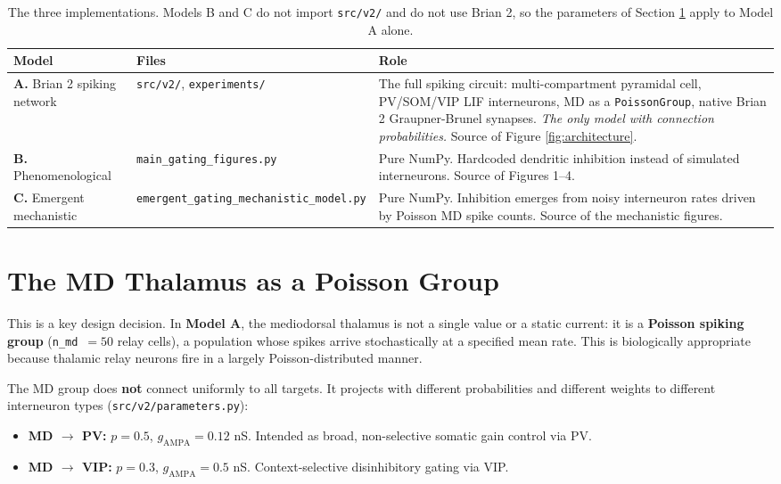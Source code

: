 \documentclass[11pt,a4paper]{article}
\begin{document}
\begin{table}[H]
    \centering
    \small
    \begin{tabular}{@{}llp{6.6cm}@{}}
    \toprule
    \textbf{Model} & \textbf{Files} & \textbf{Role} \\ \midrule
    \textbf{A.} Brian 2 spiking network
      & \texttt{src/v2/}, \texttt{experiments/}
      & The full spiking circuit: multi-compartment pyramidal cell, PV/SOM/VIP LIF
        interneurons, MD as a \texttt{PoissonGroup}, native Brian 2
        Graupner-Brunel synapses. \emph{The only model with connection
        probabilities.} Source of Figure \ref{fig:architecture}. \\ \addlinespace
    \textbf{B.} Phenomenological
      & \texttt{main\_gating\_figures.py}
      & Pure NumPy. Hardcoded dendritic inhibition instead of simulated
        interneurons. Source of Figures 1--4. \\ \addlinespace
    \textbf{C.} Emergent mechanistic
      & \texttt{emergent\_gating\_mechanistic\_model.py}
      & Pure NumPy. Inhibition emerges from noisy interneuron rates driven by
        Poisson MD spike counts. Source of the mechanistic figures. \\ \bottomrule
    \end{tabular}
    \caption{The three implementations. Models B and C do not import \texttt{src/v2/}
    and do not use Brian 2, so the parameters of Section \ref{sec:poisson} apply to
    Model A alone.}
    \label{tab:models}
\end{table}

\section{The MD Thalamus as a Poisson Group}
\label{sec:poisson}
This is a key design decision. In \textbf{Model A}, the mediodorsal thalamus is not a
single value or a static current: it is a \textbf{Poisson spiking group}
(\texttt{n\_md}~$=50$ relay cells), a population whose spikes arrive stochastically at
a specified mean rate. This is biologically appropriate because thalamic relay neurons
fire in a largely Poisson-distributed manner.

The MD group does \textbf{not} connect uniformly to all targets. It projects with
different probabilities and different weights to different interneuron types
(\texttt{src/v2/parameters.py}):
\begin{itemize}
    \item \textbf{MD $\rightarrow$ PV:} $p=0.5$, $g_{\text{AMPA}} = 0.12$ nS.
          Intended as broad, non-selective somatic gain control via PV.
    \item \textbf{MD $\rightarrow$ VIP:} $p=0.3$, $g_{\text{AMPA}} = 0.5$ nS.
          Context-selective disinhibitory gating via VIP.
\end{itemize}
\end{document}
